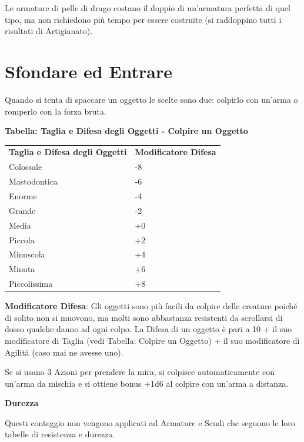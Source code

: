 \documentclass[a4paper,11pt,twoside,openany]{book}
\begin{document}
Le armature di pelle di drago costano il doppio di un'armatura perfetta di quel tipo, ma non richiedono più tempo per essere costruite (si raddoppino tutti i risultati di Artigianato).

\pagebreak

\section{Sfondare ed Entrare}

\label{sfondare-ed-entrare}

Quando si tenta di spaccare un oggetto le scelte sono due: colpirlo con un'arma o romperlo con la forza bruta.

\textbf{Tabella: Taglia e Difesa degli Oggetti - Colpire un Oggetto}
\medskip

\begin{tabular}{ll}
	\toprule
	\textbf{Taglia e Difesa degli Oggetti} & \textbf{Modificatore Difesa}\tabularnewline
	Colossale                              & -8\tabularnewline
	Mastodontica                           & -6\tabularnewline
	Enorme                                 & -4\tabularnewline
	Grande                                 & -2\tabularnewline
	Media                                  & +0\tabularnewline
	Piccola                                & +2\tabularnewline
	Minuscola                              & +4\tabularnewline
	Minuta                                 & +6\tabularnewline
	Piccolissima                           & +8\tabularnewline
\end{tabular}

\bigskip

\textbf{Modificatore Difesa}: Gli oggetti sono più facili da colpire delle creature poiché di solito non si muovono, ma molti sono abbastanza resistenti da scrollarsi di dosso qualche danno ad ogni colpo. La Difesa di un oggetto è pari a 10 + il suo modificatore di Taglia (vedi Tabella: Colpire un Oggetto) + il suo modificatore di Agilità (caso mai ne avesse uno).

Se si usano 3 Azioni per prendere la mira, si colpisce automaticamente con un'arma da mischia e si ottiene bonus +1d6 al colpire con un'arma a distanza.

\textbf{Durezza}

Questi conteggio non vengono applicati ad Armature e Scudi che seguono le loro tabelle di resistenza e durezza.

\bigskip
\end{document}

